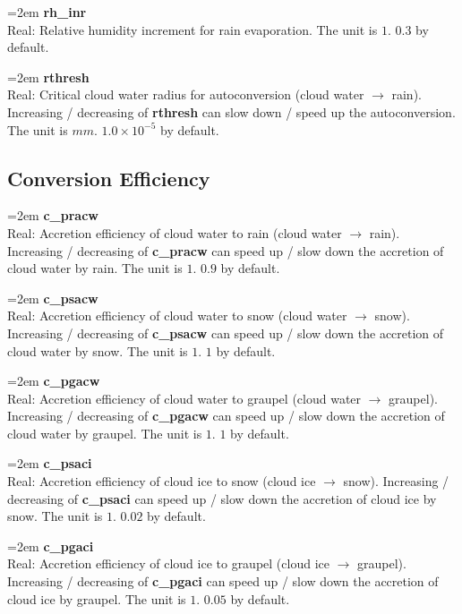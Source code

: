 \documentclass[letterpaper,titlepage,10pt]{article}
\numberwithin{equation}{section}
\begin{document}
\begin{appendices}
\hangindent=2em
\textbf{rh\_inr}\\ Real: Relative humidity increment for rain evaporation. The unit is $1$. $0.3$ by default.

\hangindent=2em
\textbf{rthresh}\\ Real: Critical cloud water radius for autoconversion (cloud water $\rightarrow$ rain). Increasing / decreasing of \textbf{rthresh} can slow down / speed up the autoconversion. The unit is $mm$. $1.0 \times 10^{-5}$ by default.


\subsection{Conversion Efficiency}

\hangindent=2em
\textbf{c\_pracw}\\ Real: Accretion efficiency of cloud water to rain (cloud water $\rightarrow$ rain). Increasing / decreasing of \textbf{c\_pracw} can speed up / slow down the accretion of cloud water by rain. The unit is $1$. $0.9$ by default.

\hangindent=2em
\textbf{c\_psacw}\\ Real: Accretion efficiency of cloud water to snow (cloud water $\rightarrow$ snow). Increasing / decreasing of \textbf{c\_psacw} can speed up / slow down the accretion of cloud water by snow. The unit is $1$. $1$ by default.

\hangindent=2em
\textbf{c\_pgacw}\\ Real: Accretion efficiency of cloud water to graupel (cloud water $\rightarrow$ graupel). Increasing / decreasing of \textbf{c\_pgacw} can speed up / slow down the accretion of cloud water by graupel. The unit is $1$. $1$ by default.

\hangindent=2em
\textbf{c\_psaci}\\ Real: Accretion efficiency of cloud ice to snow (cloud ice $\rightarrow$ snow). Increasing / decreasing of \textbf{c\_psaci} can speed up / slow down the accretion of cloud ice by snow. The unit is $1$. $0.02$ by default.

\hangindent=2em
\textbf{c\_pgaci}\\ Real: Accretion efficiency of cloud ice to graupel (cloud ice $\rightarrow$ graupel). Increasing / decreasing of \textbf{c\_pgaci} can speed up / slow down the accretion of cloud ice by graupel. The unit is $1$. $0.05$ by default.


\end{appendices}
\end{document}
